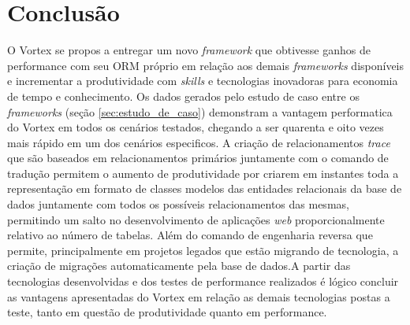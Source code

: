 \chapter{Conclusão} 
\label{chp:conclusao}

O Vortex se propos a entregar um novo \textit{framework} que obtivesse ganhos de performance com seu ORM próprio em relação aos demais \textit{frameworks} disponíveis e incrementar a produtividade com \textit{skills} e tecnologias inovadoras para economia de tempo e conhecimento. Os dados gerados pelo estudo de caso entre os \textit{frameworks} (seção \ref{sec:estudo_de_caso}) demonstram a vantagem performatica do Vortex em todos os cenários testados, chegando a ser quarenta e oito vezes mais rápido em um dos cenários especificos. A criação de relacionamentos \textit{trace} que são baseados em relacionamentos primários juntamente com o comando de tradução permitem o aumento de produtividade por criarem em instantes toda a representação em formato de classes modelos das entidades relacionais da base de dados juntamente com todos os possíveis relacionamentos das mesmas, permitindo um salto no desenvolvimento de aplicações \textit{web} proporcionalmente relativo ao número de tabelas. Além do comando de engenharia reversa que permite, principalmente em projetos legados que estão migrando de tecnologia, a criação de migrações automaticamente pela base de dados.A partir das tecnologias desenvolvidas e dos testes de performance realizados é lógico concluir as vantagens apresentadas do Vortex em relação as demais tecnologias postas a teste, tanto em questão de produtividade quanto em performance.